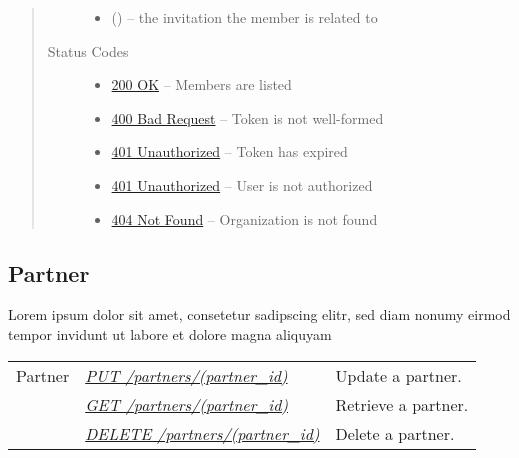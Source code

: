 \documentclass[letterpaper,10pt,english]{sphinxmanual}
\begin{document}
\begin{fulllineitems}
\begin{quote}
\begin{description}
\begin{itemize}
\item {} 
 () -- the invitation the member is related to

\end{itemize}

\item[{Status Codes}] \leavevmode\begin{itemize}
\item {} 
\href{http://www.w3.org/Protocols/rfc2616/rfc2616-sec10.html\#sec10.2.1}{200 OK} -- Members are listed

\item {} 
\href{http://www.w3.org/Protocols/rfc2616/rfc2616-sec10.html\#sec10.4.1}{400 Bad Request} -- Token is not well-formed

\item {} 
\href{http://www.w3.org/Protocols/rfc2616/rfc2616-sec10.html\#sec10.4.2}{401 Unauthorized} -- Token has expired

\item {} 
\href{http://www.w3.org/Protocols/rfc2616/rfc2616-sec10.html\#sec10.4.2}{401 Unauthorized} -- User is not authorized

\item {} 
\href{http://www.w3.org/Protocols/rfc2616/rfc2616-sec10.html\#sec10.4.5}{404 Not Found} -- Organization is not found

\end{itemize}

\end{description}\end{quote}

\end{fulllineitems}



\subsection{Partner}
\label{\detokenize{resources/partner::doc}}\label{\detokenize{resources/partner:partner}}
Lorem ipsum dolor sit amet, consetetur sadipscing elitr, sed diam nonumy eirmod tempor invidunt ut labore et dolore magna aliquyam

\noindent\begin{tabulary}{\linewidth}{|L|L|L|}
\hline
{}\relax &\relax &\relax \\
\hline
Partner
&
{\hyperref[\detokenize{resources/partner:put--partners-(partner_id)}]{\emph{PUT /partners/(partner\_id)}}}
&
Update a partner.
\\
\hline&
{\hyperref[\detokenize{resources/partner:get--partners-(partner_id)}]{\emph{GET /partners/(partner\_id)}}}
&
Retrieve a partner.
\\
\hline&
{\hyperref[\detokenize{resources/partner:delete--partners-(partner_id)}]{\emph{DELETE /partners/(partner\_id)}}}
&
Delete a partner.
\\
\hline\end{tabulary}
\end{document}
